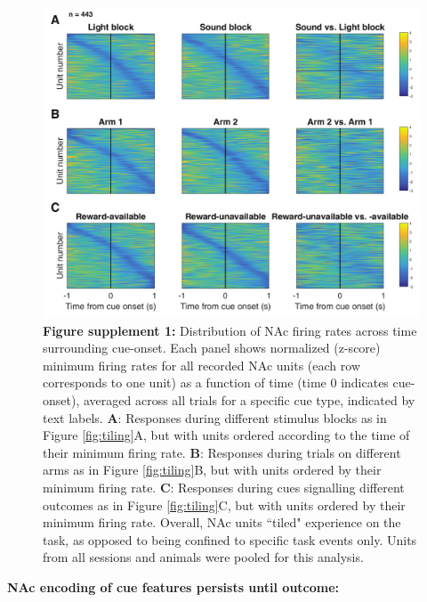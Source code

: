 \documentclass[11pt]{article}
\newcommand{\bsf}[1]{\textbf{#1}}
\begin{document}
 \begin{figure}[ht!]
\centering
\includegraphics[width=\textwidth]{Fig 6 - SUPP Task tiling MIN.pdf}
\caption*{\bsf{Figure supplement 1:} Distribution of NAc firing rates across time surrounding cue-onset. Each panel shows normalized (z-score) minimum firing rates for all recorded NAc
units (each row corresponds to one unit) as a function of time (time 0
indicates cue-onset), averaged across all trials for a specific cue type,
indicated by text labels. \bsf{A}: Responses during
different stimulus blocks as in Figure \ref{fig:tiling}A, but with units ordered according to the
time of their minimum firing rate. \bsf{B}: Responses during trials on
different arms as in Figure \ref{fig:tiling}B, but with units ordered by their minimum firing
rate. \bsf{C}: Responses during cues signalling different outcomes as in Figure \ref{fig:tiling}C,
but with units ordered by their minimum firing rate. Overall, NAc units
``tiled" experience on the task, as opposed to being confined to specific task
events only. Units from all sessions and animals were pooled for this
analysis.}
\label{fig:tilingSUPP1}
\end{figure} \clearpage

{\bf NAc encoding of cue features persists until outcome:}
\end{document}
